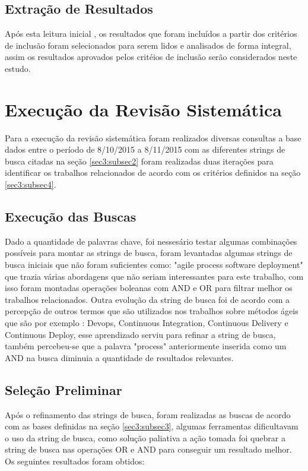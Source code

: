 \documentclass[12pt]{article}
\begin{document}
\subsection{Extração de Resultados} \label{sec3:subsec6}

Após  esta leitura inicial ,  os  resultados que foram incluídos a partir dos critérios de inclusão foram  selecionados  para  serem  lidos e  analisados de forma integral, assim os resultados aprovados pelos critéios de inclusão serão considerados neste estudo.

\section{Execução da Revisão Sistemática} \label{sec4}

Para a execução da revisão sistemática foram realizados diversas consultas a base dados entre o período de  8/10/2015 a 8/11/2015 com as diferentes strings de busca citadas na seção \ref{sec3:subsec2} foram realizadas duas iterações para identificar os trabalhos relacionados de acordo com os critérios definidos na seção \ref{sec3:subsec4}.

\subsection{Execução das Buscas} \label{sec4:subsec1}

Dado a quantidade de palavras chave, foi nessesário testar algumas combinações possíveis para montar as strings de busca, foram levantadas algumas strings de busca iniciais que não foram suficientes como: "agile process software deployment" que trazia várias abordagens que não seriam interessantes para este trabalho, com isso foram montadas operações boleanas com AND e OR para filtrar melhor os trabalhos relacionados. Outra evolução da string de busca foi de acordo com a percepção de outros termos que são utilizados nos trabalhos sobre métodos ágeis que são por exemplo : Devops, Continuous Integration, Continuous Delivery e Continuous Deploy, esse aprendizado serviu para refinar a string de busca, também percebeu-se que a palavra "process" anteriormente inserida como um AND na busca diminuia a quantidade de resultados relevantes.

\subsection{Seleção Preliminar} \label{sec4:subsec2}
Após o refinamento das strings de busca, foram realizadas as buscas de acordo com as bases definidas na seção \ref{sec3:subsec3}, algumas ferramentas dificultavam o uso da string de busca, como solução paliativa a ação tomada foi quebrar a string de busca nas operações OR e AND para conseguir um resultado melhor. Os seguintes resultados foram obtidos:
\end{document}
